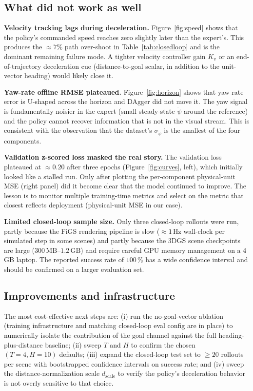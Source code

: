 \documentclass[10pt,twocolumn,letterpaper]{article}
\begin{document}
\subsection{What did not work as well}

\textbf{Velocity tracking lags during deceleration.} Figure~\ref{fig:speed} shows that the policy's commanded speed reaches zero slightly later than the expert's. This produces the $\approx 7\%$ path over-shoot in Table~\ref{tab:closedloop} and is the dominant remaining failure mode. A tighter velocity controller gain $K_v$ or an end-of-trajectory deceleration cue (distance-to-goal scalar, in addition to the unit-vector heading) would likely close it.

\textbf{Yaw-rate offline RMSE plateaued.} Figure~\ref{fig:horizon} shows that yaw-rate error is U-shaped across the horizon and DAgger did not move it. The yaw signal is fundamentally noisier in the expert (small steady-state $\dot\psi$ around the reference) and the policy cannot recover information that is not in the visual stream. This is consistent with the observation that the dataset's $\sigma_{\dot\psi}$ is the smallest of the four components.

\textbf{Validation z-scored loss masked the real story.} The validation loss plateaued at $\approx 0.20$ after three epochs (Figure~\ref{fig:curves}, left), which initially looked like a stalled run. Only after plotting the per-component physical-unit MSE (right panel) did it become clear that the model continued to improve. The lesson is to monitor multiple training-time metrics and select on the metric that closest reflects deployment (physical-unit MSE in our case).

\textbf{Limited closed-loop sample size.} Only three closed-loop rollouts were run, partly because the FiGS rendering pipeline is slow ($\approx 1\,\mathrm{Hz}$ wall-clock per simulated step in some scenes) and partly because the 3DGS scene checkpoints are large ($300\,\mathrm{MB}$--$1.2\,\mathrm{GB}$) and require careful GPU memory management on a 4\,GB laptop. The reported success rate of $100\,\%$ has a wide confidence interval and should be confirmed on a larger evaluation set.

\subsection{Improvements and infrastructure}

The most cost-effective next steps are: (i) run the no-goal-vector ablation (training infrastructure and matching closed-loop eval config are in place) to numerically isolate the contribution of the goal channel against the full heading-plus-distance baseline; (ii) sweep $T$ and $H$ to confirm the chosen $(T{=}4, H{=}10)$ defaults; (iii) expand the closed-loop test set to $\geq 20$ rollouts per scene with bootstrapped confidence intervals on success rate; and (iv) sweep the distance-normalization scale $d_{\mathrm{scale}}$ to verify the policy's deceleration behavior is not overly sensitive to that choice.
\end{document}
